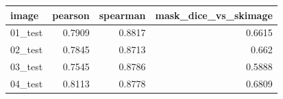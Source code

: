 \begin{tabular}{lrrr}
\toprule
image & pearson & spearman & mask_dice_vs_skimage \\
\midrule
01_test & 0.7909 & 0.8817 & 0.6615 \\
02_test & 0.7845 & 0.8713 & 0.662 \\
03_test & 0.7545 & 0.8786 & 0.5888 \\
04_test & 0.8113 & 0.8778 & 0.6809 \\
\bottomrule
\end{tabular}
